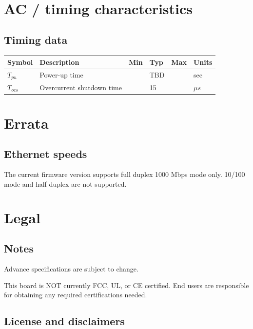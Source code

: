 \documentclass{article}
\begin{document}
\section{AC / timing characteristics}

\subsection{Timing data}

\begin{longtable}{|l|p{2in}|p{0.5in}|p{0.65in}|p{0.65in}|p{0.5in}|}
\hline
{\bf Symbol} & {\bf Description} & {\bf Min} & {\bf Typ} & {\bf Max} & {\bf Units}\\
\hline
$T_{pu}$ & Power-up time & & TBD & & sec\\
\hline
$T_{ocs}$ & Overcurrent shutdown time & & 15 & & $\mu s$\\
\hline
\end{longtable}

\pagebreak
\section{Errata}

\subsection{Ethernet speeds}

The current firmware version supports full duplex 1000 Mbps mode only. 10/100 mode and half duplex are not 
supported.

\pagebreak
\section{Legal}

\subsection{Notes}

Advance specifications are subject to change.

This board is NOT currently FCC, UL, or CE certified. End users are responsible for obtaining any required 
certifications needed.

\subsection{License and disclaimers}
                                                                                                                   
\end{document}
